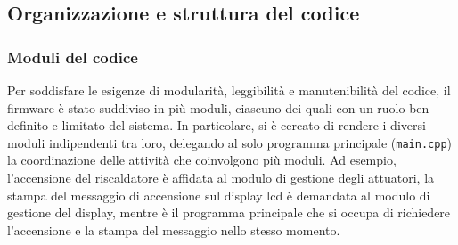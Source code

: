 \subsection{Organizzazione e struttura del codice}
\subsubsection{Moduli del codice}
Per soddisfare le esigenze di modularità, leggibilità e manutenibilità del codice, il firmware è stato suddiviso in
più moduli, ciascuno dei quali con un ruolo ben definito e limitato del sistema. In particolare, si è cercato di rendere
i diversi moduli indipendenti tra loro, delegando al solo programma principale (\verb|main.cpp|) la coordinazione delle
attività che coinvolgono più moduli. Ad esempio, l'accensione del riscaldatore è affidata al modulo di gestione degli
attuatori, la stampa del messaggio di accensione sul display lcd è demandata al modulo di gestione del display, mentre
è il programma principale che si occupa di richiedere l'accensione e la stampa del messaggio nello stesso momento.

